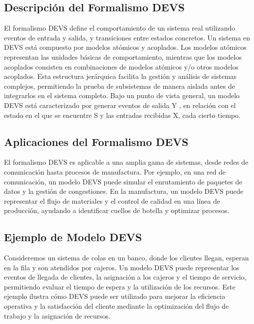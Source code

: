 \documentclass[12pt,twoside]{templates/unerthesis}
\begin{document}
\hypertarget{descripciuxf3n-del-formalismo-devs}{%
\subsection{Descripción del Formalismo DEVS}\label{descripciuxf3n-del-formalismo-devs}}

El formalismo DEVS define el comportamiento de un sistema real utilizando eventos de entrada y salida, y transiciones entre estados concretos. Un sistema en DEVS está compuesto por modelos atómicos y acoplados. Los modelos atómicos representan las unidades básicas de comportamiento, mientras que los modelos acoplados consisten en combinaciones de modelos atómicos y/o otros modelos acoplados. Esta estructura jerárquica facilita la gestión y análisis de sistemas complejos, permitiendo la prueba de subsistemas de manera aislada antes de integrarlos en el sistema completo.
Bajo un punto de vista general, un modelo DEVS está caracterizado por generar eventos de salida Y , en relación con el estado en el que se encuentre S y las entradas recibidas X, cada cierto tiempo.

\hypertarget{aplicaciones-del-formalismo-devs}{%
\subsection{Aplicaciones del Formalismo DEVS}\label{aplicaciones-del-formalismo-devs}}

El formalismo DEVS es aplicable a una amplia gama de sistemas, desde redes de comunicación hasta procesos de manufactura. Por ejemplo, en una red de comunicación, un modelo DEVS puede simular el enrutamiento de paquetes de datos y la gestión de congestiones. En la manufactura, un modelo DEVS puede representar el flujo de materiales y el control de calidad en una línea de producción, ayudando a identificar cuellos de botella y optimizar procesos.

\hypertarget{ejemplo-de-modelo-devs}{%
\subsection{Ejemplo de Modelo DEVS}\label{ejemplo-de-modelo-devs}}

Consideremos un sistema de colas en un banco, donde los clientes llegan, esperan en la fila y son atendidos por cajeros. Un modelo DEVS puede representar los eventos de llegada de clientes, la asignación a los cajeros y el tiempo de servicio, permitiendo evaluar el tiempo de espera y la utilización de los recursos. Este ejemplo ilustra cómo DEVS puede ser utilizado para mejorar la eficiencia operativa y la satisfacción del cliente mediante la optimización del flujo de trabajo y la asignación de recursos.
\end{document}
